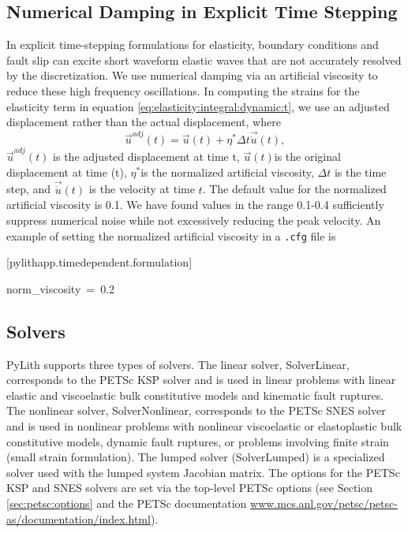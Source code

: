 \subsection{Numerical Damping in Explicit Time Stepping}

In explicit time-stepping formulations for elasticity, boundary conditions
and fault slip can excite short waveform elastic waves that are not
accurately resolved by the discretization. We use numerical damping
via an artificial viscosity\cite{Knopoff:Ni:2001,Day:Ely:2002} to
reduce these high frequency oscillations. In computing the strains
for the elasticity term in equation \ref{eq:elasticity:integral:dynamic:t},
we use an adjusted displacement rather than the actual displacement,
where 
\begin{equation}
\vec{u}^{adj}(t)=\vec{u}(t)+\eta^{*}\Delta t\vec{\dot{u}}(t),
\end{equation}
$\vec{u}^{adj}(t)$ is the adjusted displacement at time t, $\vec{u}(t)$is
the original displacement at time (t), $\eta^{*}$is the normalized
artificial viscosity, $\Delta t$ is the time step, and $\vec{\dot{u}}(t)$
is the velocity at time $t$. The default value for the normalized
artificial viscosity is 0.1. We have found values in the range 0.1-0.4
sufficiently suppress numerical noise while not excessively reducing
the peak velocity. An example of setting the normalized artificial
viscosity in a \texttt{.cfg} file is
\begin{lyxcode}
{[}pylithapp.timedependent.formulation{]}

norm\_viscosity~=~0.2
\end{lyxcode}

\subsection{\label{sec:solvers}Solvers}

PyLith supports three types of solvers. The linear solver, SolverLinear,
corresponds to the PETSc KSP solver and is used in linear problems
with linear elastic and viscoelastic bulk constitutive models and
kinematic fault ruptures. The nonlinear solver, SolverNonlinear, corresponds
to the PETSc SNES solver and is used in nonlinear problems with nonlinear
viscoelastic or elastoplastic bulk constitutive models, dynamic fault
ruptures, or problems involving finite strain (small strain formulation).
The lumped solver (SolverLumped) is a specialized solver used with
the lumped system Jacobian matrix. The options for the PETSc KSP and
SNES solvers are set via the top-level PETSc options (see Section
\ref{sec:petsc:options} and the PETSc documentation \url{www.mcs.anl.gov/petsc/petsc-as/documentation/index.html}).


